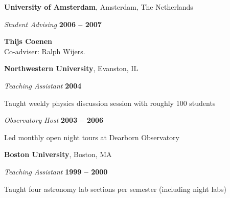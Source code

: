 \documentclass[11pt]{article}
\newcommand{\halfblankline}{\quad\vspace{-0.5\baselineskip}\pagebreak[3]}
\begin{document}
\halfblankline

\textbf{University of Amsterdam}, Amsterdam, The Netherlands
\begin{outerlist}

\item[] \textit{Student Advising}
    \hfill \textbf{2006 -- 2007}
    \begin{innerlist}
       \item \textbf{Thijs Coenen} \\
        Co-adviser: Ralph Wijers.
     \end{innerlist}
\end{outerlist}

\halfblankline

\textbf{Northwestern University}, Evanston, IL
\begin{outerlist}

\item[] \textit{Teaching Assistant} 
    \hfill \textbf{2004}
    \begin{innerlist}
        \item Taught weekly physics discussion session with roughly 100 students
    \end{innerlist}

\item[] \textit{Observatory Host} 
    \hfill \textbf{2003 -- 2006}
    \begin{innerlist}
        \item Led monthly open night tours at Dearborn Observatory
    \end{innerlist}
    
\end{outerlist}

\halfblankline

\textbf{Boston University}, Boston, MA
\begin{outerlist}

\item[] \textit{Teaching Assistant} 
    \hfill \textbf{1999 -- 2000}
    \begin{innerlist}
        \item Taught four astronomy lab sections per semester (including night labs)
    \end{innerlist}
\end{outerlist}

\halfblankline
\end{document}
